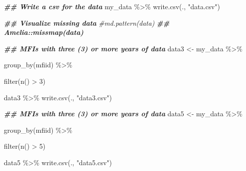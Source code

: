 \documentclass[a4paper,nobind]{templates/ociamthesis}
\newenvironment{Shaded}{\begin{snugshade}}{\end{snugshade}}
\newcommand{\CommentTok}[1]{\textcolor[rgb]{0.56,0.35,0.01}{\textit{#1}}}
\newcommand{\DecValTok}[1]{\textcolor[rgb]{0.00,0.00,0.81}{#1}}
\newcommand{\DocumentationTok}[1]{\textcolor[rgb]{0.56,0.35,0.01}{\textbf{\textit{#1}}}}
\newcommand{\FunctionTok}[1]{\textcolor[rgb]{0.00,0.00,0.00}{#1}}
\newcommand{\NormalTok}[1]{#1}
\newcommand{\OtherTok}[1]{\textcolor[rgb]{0.56,0.35,0.01}{#1}}
\newcommand{\SpecialCharTok}[1]{\textcolor[rgb]{0.00,0.00,0.00}{#1}}
\newcommand{\StringTok}[1]{\textcolor[rgb]{0.31,0.60,0.02}{#1}}
\renewenvironment{Shaded}
{
  \vspace{10pt}%
  \begin{snugshade}%
}{%
  \end{snugshade}%
  \vspace{8pt}%
}
\begin{document}
\begin{Shaded}
\begin{Highlighting}[]
\DocumentationTok{\#\# Write a csv for the data}
\NormalTok{my\_data }\SpecialCharTok{\%\textgreater{}\%} \FunctionTok{write.csv}\NormalTok{(., }\StringTok{"data.csv"}\NormalTok{)}

\DocumentationTok{\#\# Visualize missing data}
\CommentTok{\#md.pattern(data)}
\DocumentationTok{\#\# Amelia::missmap(data)}

\DocumentationTok{\#\# MFIs with three (3) or more years of data}
\NormalTok{data3 }\OtherTok{\textless{}{-}}\NormalTok{ my\_data }\SpecialCharTok{\%\textgreater{}\%} 
  
  \FunctionTok{group\_by}\NormalTok{(mfiid) }\SpecialCharTok{\%\textgreater{}\%} 
  
  \FunctionTok{filter}\NormalTok{(}\FunctionTok{n}\NormalTok{() }\SpecialCharTok{\textgreater{}} \DecValTok{3}\NormalTok{)}
  
\NormalTok{data3 }\SpecialCharTok{\%\textgreater{}\%} \FunctionTok{write.csv}\NormalTok{(., }\StringTok{"data3.csv"}\NormalTok{)}

\DocumentationTok{\#\# MFIs with three (3) or more years of data}
\NormalTok{data5 }\OtherTok{\textless{}{-}}\NormalTok{ my\_data }\SpecialCharTok{\%\textgreater{}\%} 
  
  \FunctionTok{group\_by}\NormalTok{(mfiid) }\SpecialCharTok{\%\textgreater{}\%} 
  
  \FunctionTok{filter}\NormalTok{(}\FunctionTok{n}\NormalTok{() }\SpecialCharTok{\textgreater{}} \DecValTok{5}\NormalTok{)  }
  
\NormalTok{data5 }\SpecialCharTok{\%\textgreater{}\%} \FunctionTok{write.csv}\NormalTok{(., }\StringTok{"data5.csv"}\NormalTok{)}
\end{Highlighting}
\end{Shaded}
\end{document}
